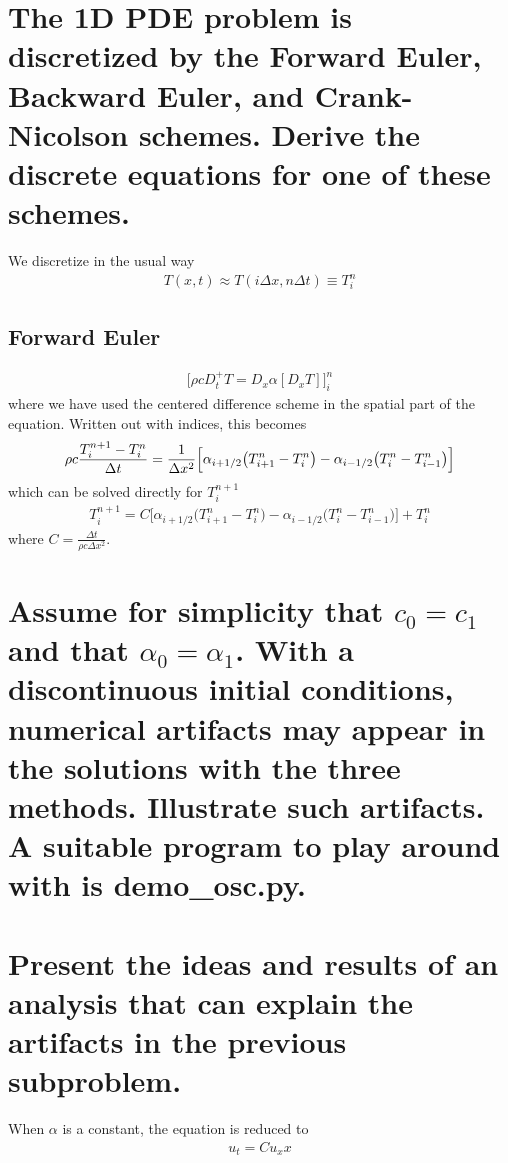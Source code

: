 \documentclass[a4paper,10pt]{article}
\renewcommand{\(}{\left(}
\renewcommand{\)}{\right)}
\begin{document}
\section{The 1D PDE problem is discretized by the Forward Euler, Backward Euler, and Crank-Nicolson schemes. Derive the discrete equations for one of these schemes.}
We discretize in the usual way
\begin{align*}
  T(x,t)\approx T(i\Delta x,n\Delta t) \equiv T^n_i
\end{align*}
\subsection{Forward Euler}
\begin{align*}
  \Big[\rho c D_t^+T = D_x\alpha[D_xT]\Big]^n_i
\end{align*}
where we have used the centered difference scheme in the spatial part of the equation. Written out with indices, this becomes
\begin{align*}
  \rho c {T^{n+1}_i - T^{n}_i\over \Delta t} = \frac{1}{\Delta x^2}\Big[\alpha_{i+1/2}\big(T^n_{i+1} - T^n_{i}\big) - \alpha_{i-1/2}\big(T^n_i - T^n_{i-1}\big)\Big]
\end{align*}
which can be solved directly for $T^{n+1}_i$
  \begin{align*}
  T^{n+1}_i = C\Big[\alpha_{i+1/2}\big(T^n_{i+1} - T^n_{i}\big) - \alpha_{i-1/2}\big(T^n_i - T^n_{i-1}\big)\Big] + T^{n}_i
\end{align*}
where $C=\frac{\Delta t}{\rho c\Delta x^2}$.
\section{Assume for simplicity that $c_0=c_1$ and that $\alpha_0=\alpha_1$. With a discontinuous initial conditions, numerical artifacts may appear in the solutions with the three methods. Illustrate such artifacts. A suitable program to play around with is demo\_osc.py.}

\section{Present the ideas and results of an analysis that can explain the artifacts in the previous subproblem.}
When $\alpha$ is a constant, the equation is reduced to
\begin{align*}
  u_t = Cu_xx
\end{align*}
\end{document}
